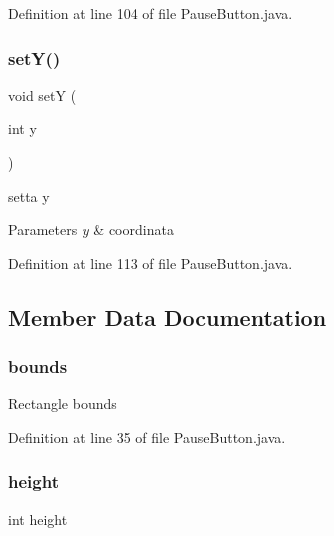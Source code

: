 Definition at line 104 of file Pause\+Button.\+java.

\mbox{\label{classui_1_1_pause_button_adea78a9ff1234e75627dda61d972213b}} 
\subsubsection{\texorpdfstring{set\+Y()}{setY()}}
{\footnotesize\ttfamily void setY (\begin{DoxyParamCaption}\item[{int}]{y }\end{DoxyParamCaption})}



setta y 


\begin{DoxyParams}{Parameters}
{\em y} & coordinata \\
\hline
\end{DoxyParams}


Definition at line 113 of file Pause\+Button.\+java.



\subsection{Member Data Documentation}
\mbox{\label{classui_1_1_pause_button_a62df0866a4faf552c81108aff64e8eff}} 
\subsubsection{\texorpdfstring{bounds}{bounds}}
{\footnotesize\ttfamily Rectangle bounds\hspace{0.3cm}{\ttfamily [protected]}}



Definition at line 35 of file Pause\+Button.\+java.

\mbox{\label{classui_1_1_pause_button_ad12fc34ce789bce6c8a05d8a17138534}} 
\subsubsection{\texorpdfstring{height}{height}}
{\footnotesize\ttfamily int height\hspace{0.3cm}{\ttfamily [protected]}}



